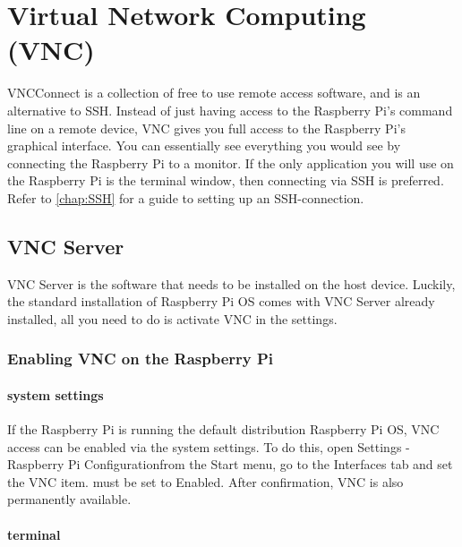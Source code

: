%
%

\chapter{Virtual Network Computing (VNC)}
\label{chap:VNC}


VNC\textregistered \space Connect is a collection of  free to use remote access software, and is an alternative to SSH. Instead of just having access to the Raspberry Pi's command line on a remote device, VNC gives you full access to the Raspberry Pi's graphical interface. You can essentially see everything you would see by connecting the Raspberry Pi to a monitor. If the only application you will use on the Raspberry Pi is the terminal window, then connecting via SSH is preferred. Refer to \autoref{chap:SSH} for a guide to setting up an SSH-connection.


\section{VNC Server}

VNC Server is the software that needs to be installed on the host device. Luckily, the standard installation of Raspberry Pi OS comes with VNC Server already installed, all you need to do is activate VNC in the settings.

\subsection{Enabling VNC on the Raspberry Pi}

\subsubsection{system settings}

If the Raspberry Pi is running the default distribution Raspberry Pi OS, VNC access can be enabled via the system settings. To do this, open \glqq Settings - Raspberry Pi Configuration\grqq from the Start menu, go to the \glqq Interfaces\grqq{} tab and set the \glqq VNC\grqq{} item.
must be set to \glqq Enabled\grqq{}. After confirmation, VNC is also permanently available.

\subsubsection{terminal}

